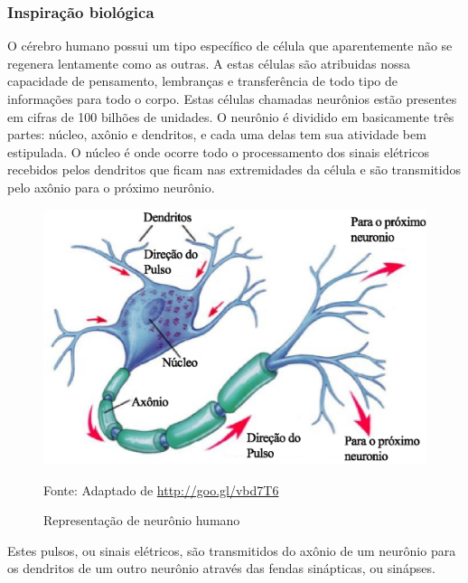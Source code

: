 \subsubsection{Inspiração biológica}

    O cérebro humano possui um tipo específico de célula que aparentemente não se regenera lentamente como as outras. A estas células são atribuidas nossa capacidade de pensamento, lembranças e transferência de todo tipo de informações para todo o corpo. Estas células chamadas neurônios estão presentes em cifras de 100 bilhões de unidades. \cite{anderson1992artificial}
    O neurônio é dividido em basicamente três partes: núcleo, axônio e dendritos, e cada uma delas tem sua atividade bem estipulada. O núcleo é onde ocorre todo o processamento dos sinais elétricos recebidos pelos dendritos que ficam nas extremidades da célula e são transmitidos pelo axônio para o próximo neurônio.

    \begin{figure}[ht]
        \centering
        \label{fig01}
            \includegraphics[keepaspectratio=true, scale=0.4]{editaveis/images/neuronio.eps}
        \caption{Representação de neurônio humano}
        Fonte: Adaptado de \url{http://goo.gl/vbd7T6}
    \end{figure}

    Estes pulsos, ou sinais elétricos, são transmitidos do axônio de um neurônio para os dendritos de um outro neurônio através das fendas sinápticas, ou sinápses.


